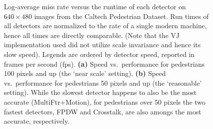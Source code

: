 \documentclass[10pt,letterpaper]{article}
\begin{document}
\begin{figure} \center \subfiguretopcaptrue
{}
\caption{ \footnotesize Log-average miss rate versus the runtime of each detector on $640 \times 480$ images from the Caltech Pedestrian Dataset. Run times of all detectors are normalized to the rate of a single modern machine, hence all times are directly comparable. (Note that the VJ implementation used did not utilize scale invariance and hence its slow speed). Legends are ordered by detector speed, reported in frames per second (fps). \textbf{(a)} Speed vs.~performance for pedestrians 100 pixels and up (the `near scale' setting). \textbf{(b)} Speed vs.~performance for pedestrians 50 pixels and up (the `reasonable' setting). While the slowest detector happens to also be the most accurate (MultiFtr+Motion), for pedestrians over 50 pixels the two fastest detectors, FPDW and Crosstalk, are also amongs the most accurate, respectively. }
\label{fig:res:speed}
\end{figure}
\end{document}
